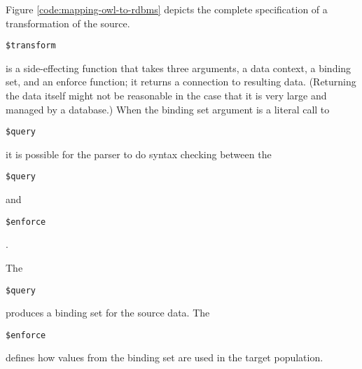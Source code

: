 \documentclass[9pt,letterpaper]{article}
\newcommand{\stt}[1]{\begin{footnotesize}\texttt{#1}\end{footnotesize}}
\begin{document}
%

Figure \ref{code:mapping-owl-to-rdbms} depicts the complete specification of a transformation of the source.
\stt{\$transform} is a side-effecting function that takes three arguments, a data context, a binding set, and an enforce function;
it returns a connection to resulting data.
(Returning the data itself might not be reasonable in the case that it is very large and managed by a database.)
When the binding set argument is a literal call to \stt{\$query} it is possible for the parser to do syntax checking between
the \stt{\$query} and \stt{\$enforce}.

The \stt{\$query} produces a binding set for the source data.
The \stt{\$enforce} defines how values from the binding set are used in the target population.

\end{document}
